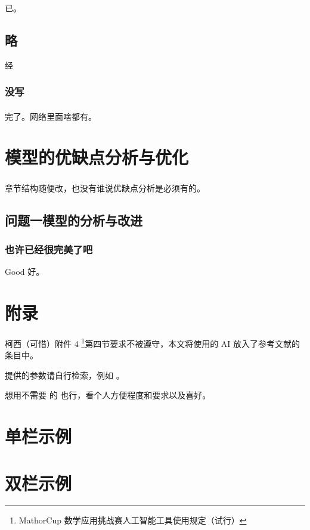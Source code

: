 \documentclass{MMCStyle}
\newcommand{\mysupercite}[1]{\textsuperscript{\cite{#1}}} %
\begin{document}
已。

\subsection{略}

经

\subsubsection{没写}

完了。网络\mysupercite{web01}里面啥都有。

\section{模型的优缺点分析与优化}

章节结构随便改，也没有谁说优缺点\mysupercite{paper01}分析是必须有的。

\subsection{问题一模型的分析与改进}

\subsubsection{也许已经很完美了吧}

Good 好。

{}
{}
% 
\printbibliography[title={参考文献}] %

\appendix

\section*{附录}


柯西（可惜）附件 4 \footnote{MathorCup 数学应用挑战赛人工智能工具使用规定（试行）}第四节要求不被遵守，本文将使用的 AI 放入了参考文献的条目中。

 提供的参数请自行检索，例如  。

想用不需要  的  也行，看个人方便程度和要求以及喜好。

\section{单栏示例}



\section{双栏示例}


\end{document}
